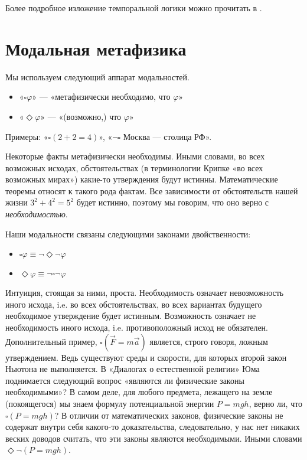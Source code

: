 \documentclass[openany]{book}
\theoremstyle{plain}
\theoremstyle{definition}
\begin{document}
Более подробное изложение темпоральной логики можно прочитать в \cite{Goranko}.

\chapter{ Модальная метафизика }

Мы используем следующий аппарат модальностей.
\begin{itemize}
\item «\(\square \varphi\)» — «метафизически необходимо, что \(\varphi\)»
\item «\(\Diamond \varphi\)» — «(возможно,) что \(\varphi\)»
\end{itemize}

Примеры: «\(\square (2+2=4)\)», «\(\neg \square\) Москва — столица РФ».

Некоторые факты метафизически необходимы. Иными словами, во всех возможных исходах, обстоятельствах (в терминологии Крипке «во всех возможных мирах») какие-то утверждения будут истинны. Математические теоремы относят к такого рода фактам. Все зависимости от обстоятельств нашей жизни \(3^2 + 4^2 = 5^2\) будет истинно, поэтому мы говорим, что оно верно с \textit{необходимостью}.

Наши модальности связаны следующими законами двойственности:
\begin{itemize}
\item \(\square \varphi \equiv \neg \Diamond \neg \varphi\)
\item \(\Diamond \varphi \equiv \neg \square \neg \varphi\)
\end{itemize}

Интуиция, стоящая за ними, проста. Необходимость означает невозможность иного исхода, i.e. во всех обстоятельствах, во всех вариантах будущего необходимое утверждение будет истинным. Возможность означает не необходимость иного исхода, i.e. противоположный исход не обязателен. Дополнительный пример, \(\square(\vec{F} = m \vec{a})\) является, строго говоря, ложным утверждением. Ведь существуют среды и скорости, для которых второй закон Ньютона не выполняется. В «Диалогах о естественной религии» Юма поднимается следующий вопрос «являются ли физические законы необходимыми»? В самом деле, для любого предмета, лежащего на земле (покоящегося) мы знаем формулу потенциальной энергии \(P = mgh\), верно ли, что \(\square(P = mgh)\)? В отличии от математических законов, физические законы не содержат внутри себя какого-то доказательства, следовательно, у нас нет никаких веских доводов считать, что эти законы являются необходимыми. Иными словами \(\Diamond \neg(P = mgh)\).
\end{document}
